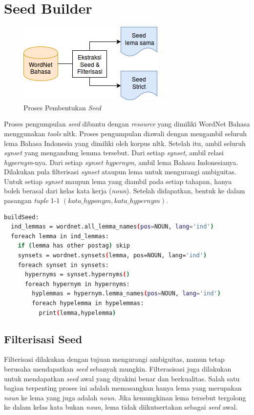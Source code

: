 \section{Seed Builder}
\begin{figure}
    \centering
    \includegraphics[scale=0.6]{pics/Pic02-SeedBuilder}
    \caption{Proses Pembentukan \textit{Seed}}
    \label{fig:seed-builder}
\end{figure}
Proses pengumpulan \textit{seed} dibantu dengan \textit{resource} yang dimiliki WordNet Bahasa menggunakan \textit{tools} nltk. Proses pengumpulan diawali dengan mengambil seluruh lema Bahasa Indonesia yang dimiliki oleh korpus nltk. Setelah itu, ambil seluruh \textit{synset} yang mengandung lemma tersebut. Dari setiap \textit{synset}, ambil relasi \textit{hypernym}-nya. Dari setiap \textit{synset hypernym}, ambil lema Bahasa Indonesianya. Dilakukan pula filterisasi \textit{synset} ataupun lema untuk mengurangi ambiguitas. Untuk setiap \textit{synset} maupun lema yang diambil pada setiap tahapan, hanya boleh berasal dari kelas kata kerja (\textit{noun}). Setelah didapatkan, bentuk ke dalam pasangan \textit{tuple} 1-1 $(kata\_hyponym,kata\_hypernym)$.
\begin{lstlisting}[language=bash]
buildSeed:
  ind_lemmas = wordnet.all_lemma_names(pos=NOUN, lang='ind')
  foreach lemma in ind_lemmas:
    if (lemma has other postag) skip
    synsets = wordnet.synsets(lemma, pos=NOUN, lang='ind')
    foreach synset in synsets:
      hypernyms = synset.hypernyms()
      foreach hypernym in hypernyms:
        hyplemmas = hypernym.lemma_names(pos=NOUN, lang='ind')
        foreach hypelemma in hypelemmas:
          print(lemma,hypelemma)
\end{lstlisting}

\subsection{Filterisasi Seed}
Filterisasi dilakukan dengan tujuan mengurangi ambiguitas, namun tetap berusaha mendapatkan \textit{seed} sebanyak mungkin. Filterasisasi juga dilakukan untuk mendapatkan \textit{seed} awal yang diyakini benar dan berkualitas. Salah satu bagian terpenting proses ini adalah memasangkan hanya lema yang merupakan \textit{noun} ke lema yang juga adalah \textit{noun}. Jika kemungkinan lema tersebut tergolong ke dalam kelas kata bukan \textit{noun}, lema tidak diikutsertakan sebagai \textit{seed} awal.

